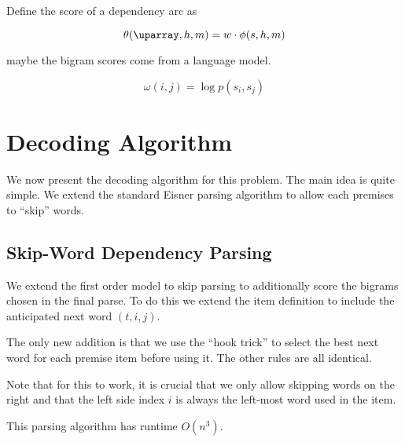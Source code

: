 \documentclass[11pt]{article}
\begin{document}
Define the score of a dependency arc as

\[\theta(\uparray, h,m) = w \cdot \phi(s, h, m)  \]

maybe the bigram scores come from a language model.

\[\omega(i,j) = \log p(s_i, s_j) \]



\section{Decoding Algorithm}

We now present the decoding algorithm for this problem. The
main idea is quite simple. We extend the standard Eisner parsing
algorithm to allow each premises to ``skip'' words.


\subsection{Skip-Word Dependency Parsing}


We extend the first order model to skip parsing to additionally score the bigrams chosen in the final parse. To do this we extend the item definition to include the anticipated next word $(t, i, j)$.

The only new addition is that we use the ``hook trick'' to select the best next word for each premise item before using it. The other rules are all identical.

Note that for this to work, it is crucial that we only allow skipping words on the right and that the left side index $i$ is always the left-most word used in the item.

This parsing algorithm has runtime $O(n^3)$.
\end{document}
